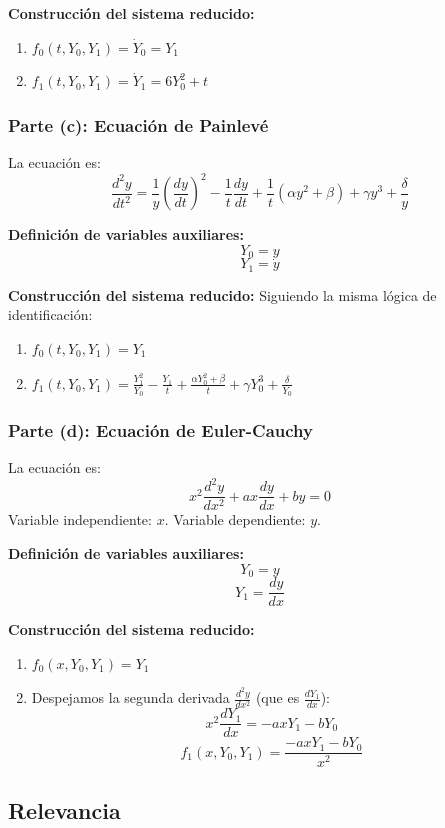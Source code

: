 \documentclass[12pt, letterpaper]{article}
\begin{document}
\textbf{Construcción del sistema reducido:}
\begin{enumerate}
    \item $f_0(t, Y_0, Y_1) = \dot{Y}_0 = Y_1$
    \item $f_1(t, Y_0, Y_1) = \dot{Y}_1 = 6Y_0^2 + t$
\end{enumerate}

\subsubsection*{Parte (c): Ecuación de Painlevé}

La ecuación es:
$$ \frac{d^2y}{dt^2} = \frac{1}{y} \left( \frac{dy}{dt} \right)^2 - \frac{1}{t} \frac{dy}{dt} + \frac{1}{t} (\alpha y^2 + \beta) + \gamma y^3 + \frac{\delta}{y} $$

\textbf{Definición de variables auxiliares:}
$$ Y_0 = y $$
$$ Y_1 = \dot{y} $$

\textbf{Construcción del sistema reducido:}
Siguiendo la misma lógica de identificación:
\begin{enumerate}
    \item $f_0(t, Y_0, Y_1) = Y_1$
    \item $f_1(t, Y_0, Y_1) = \frac{Y_1^2}{Y_0} - \frac{Y_1}{t} + \frac{\alpha Y_0^2 + \beta}{t} + \gamma Y_0^3 + \frac{\delta}{Y_0}$
\end{enumerate}

\subsubsection*{Parte (d): Ecuación de Euler-Cauchy}

La ecuación es:
$$ x^2 \frac{d^2y}{dx^2} + ax \frac{dy}{dx} + by = 0 $$
Variable independiente: $x$. Variable dependiente: $y$.

\textbf{Definición de variables auxiliares:}
$$ Y_0 = y $$
$$ Y_1 = \frac{dy}{dx} $$

\textbf{Construcción del sistema reducido:}
\begin{enumerate}
    \item $f_0(x, Y_0, Y_1) = Y_1$
    \item Despejamos la segunda derivada $\frac{d^2y}{dx^2}$ (que es $\frac{dY_1}{dx}$):
    $$ x^2 \frac{dY_1}{dx} = -ax Y_1 - b Y_0 $$
    $$ f_1(x, Y_0, Y_1) = \frac{-ax Y_1 - b Y_0}{x^2} $$
\end{enumerate}

\subsection{Relevancia}
\end{document}
